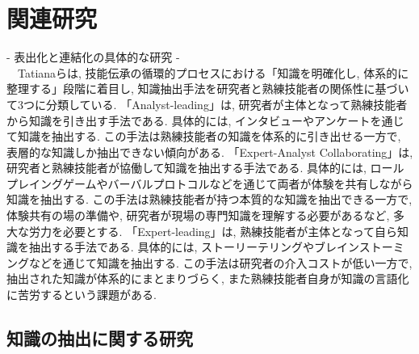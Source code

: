 \chapter{関連研究}

- 表出化と連結化の具体的な研究 -\\
　Tatianaらは, 技能伝承の循環的プロセスにおける「知識を明確化し, 体系的に整理する」段階に着目し, 知識抽出手法を研究者と熟練技能者の関係性に基づいて3つに分類している\cite{Tatiana2012}.  「Analyst-leading」は, 研究者が主体となって熟練技能者から知識を引き出す手法である. 具体的には, インタビューやアンケートを通じて知識を抽出する. この手法は熟練技能者の知識を体系的に引き出せる一方で, 表層的な知識しか抽出できない傾向がある. 「Expert-Analyst Collaborating」は, 研究者と熟練技能者が協働して知識を抽出する手法である. 具体的には, ロールプレイングゲームやバーバルプロトコルなどを通じて両者が体験を共有しながら知識を抽出する. この手法は熟練技能者が持つ本質的な知識を抽出できる一方で, 体験共有の場の準備や, 研究者が現場の専門知識を理解する必要があるなど, 多大な労力を必要とする. 「Expert-leading」は, 熟練技能者が主体となって自ら知識を抽出する手法である. 具体的には, ストーリーテリングやブレインストーミングなどを通じて知識を抽出する. この手法は研究者の介入コストが低い一方で, 抽出された知識が体系的にまとまりづらく, また熟練技能者自身が知識の言語化に苦労するという課題がある.\\
\section{知識の抽出に関する研究}

